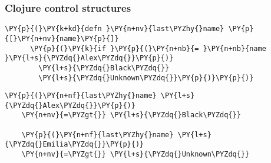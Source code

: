 \begin{frame}[fragile]
  \frametitle{Clojure control structures}

  \begin{Verbatim}[commandchars=\\\{\}]
    \PY{p}{(}\PY{k+kd}{defn }\PY{n+nv}{last\PYZhy{}name} \PY{p}{[}\PY{n+nv}{name}\PY{p}{]}
      \PY{p}{(}\PY{k}{if }\PY{p}{(}\PY{n+nb}{= }\PY{n+nb}{name }\PY{l+s}{\PYZdq{}Alex\PYZdq{}}\PY{p}{)}
        \PY{l+s}{\PYZdq{}Black\PYZdq{}}
        \PY{l+s}{\PYZdq{}Unknown\PYZdq{}}\PY{p}{)}\PY{p}{)}
  \end{Verbatim}

  \pause

  \begin{Verbatim}[commandchars=\\\{\}]
    \PY{p}{(}\PY{n+nf}{last\PYZhy{}name} \PY{l+s}{\PYZdq{}Alex\PYZdq{}}\PY{p}{)}
    \PY{n+nv}{=\PYZgt{}} \PY{l+s}{\PYZdq{}Black\PYZdq{}}

    \PY{p}{(}\PY{n+nf}{last\PYZhy{}name} \PY{l+s}{\PYZdq{}Emilia\PYZdq{}}\PY{p}{)}
    \PY{n+nv}{=\PYZgt{}} \PY{l+s}{\PYZdq{}Unknown\PYZdq{}}
  \end{Verbatim}
\end{frame}


